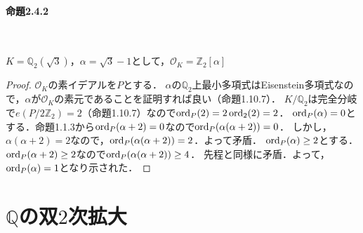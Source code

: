 \paragraph{命題2.4.2}~
\begin{screen}
  $K=\mathbb{Q}_2(\sqrt{3})$，$\alpha=\sqrt{3}-1$として，$\mathcal{O}_K=\mathbb{Z}_2[\alpha]$
\end{screen}
\begin{proof}
  $\mathcal{O}_K$の素イデアルを$P$とする．
  $\alpha$の$\mathbb{Q}_2$上最小多項式はEisenstein多項式なので，$\alpha$が$\mathcal{O}_K$の素元であることを証明すれば良い（命題1.10.7）．
  $K/\mathbb{Q}_2$は完全分岐で$e(P/2\mathbb{Z}_2)=2$（命題1.10.7）なので$\operatorname{ord}_P(2)=2\operatorname{ord}_2(2)=2$．
  $\operatorname{ord}_P(\alpha)=0$とする．命題1.1.3から$\operatorname{ord}_P(\alpha+2)=0$なので$\operatorname{ord}_P(\alpha(\alpha+2))=0$．
  しかし，$\alpha(\alpha+2)=2$なので，$\operatorname{ord}_P(\alpha(\alpha+2))=2$．よって矛盾．
  $\operatorname{ord}_P(\alpha)\geq2$とする．$\operatorname{ord}_P(\alpha+2)\geq2$なので$\operatorname{ord}_P(\alpha(\alpha+2))\geq4$．
  先程と同様に矛盾．よって，$\operatorname{ord}_P(\alpha)=1$となり示された．
\end{proof}

\section{$\mathbb{Q}$の双$2$次拡大}
